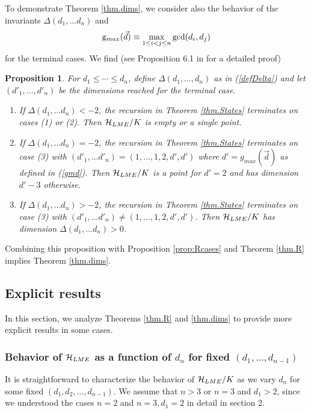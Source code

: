 \documentclass[12pt]{article}
\newtheorem{proposition}[theorem]{Proposition}
\theoremstyle{definition}
\newcommand{\be}{\begin{equation}}
\newcommand{\ee}{\end{equation}}
\begin{document}
To demonstrate Theorem \ref{thm.dims}, we consider also the behavior of the invariants $\Delta(d_1, \dots d_n)$ and
\be
\label{gmd2}
{\rm g}_{max}(\vec{d}) \equiv \max_{1 \le i < j \le n} \gcd(d_i,d_j)
\ee
for the terminal cases. We find (see Proposition 6.1 in \cite{mathpaper} for a detailed proof)
\begin{proposition} \label{prop.terminal}
For $d_1 \le \cdots \le d_n$, define $\Delta(d_1, \dots, d_n)$ as in (\ref{defDelta}) and let $(d'_1, \dots, d'_n)$ be the dimensions reached for the terminal case.
\begin{enumerate}
\item
If $\Delta(d_1, \dots d_n) < -2$, the recursion in Theorem \ref{thm.States} terminates on cases (1) or (2). Then ${\cal H}_{LME}/K$ is empty or a single point.
\item
If $\Delta(d_1, \dots d_n) = -2$, the recursion in Theorem \ref{thm.States} terminates on case (3) with $(d'_1, \dots d'_n) = (1,\dots,1,2,d',d')$ where $d' = g_{max}(\vec{d})$ as defined in (\ref{gmd}). Then ${\cal H}_{LME}/K$ is a point for $d'=2$ and has dimension $d'-3$ otherwise.
\item
If $\Delta(d_1, \dots d_n) > -2$, the recursion in Theorem \ref{thm.States} terminates on case (3) with $(d'_1, \dots d'_n) \ne (1,\dots,1,2,d',d')$. Then ${\cal H}_{LME}/K$ has dimension $\Delta(d_1, \dots d_n) > 0$.
\end{enumerate}
\end{proposition}
Combining this proposition with Proposition \ref{prop:Rcases} and Theorem \ref{thm.R} implies Theorem \ref{thm.dims}.

\subsection{Explicit results}

In this section, we analyze Theorems \ref{thm.R} and \ref{thm.dims} to provide more explicit results in some cases.

\subsubsection*{Behavior of ${\cal H}_{LME}$ as a function of $d_n$ for fixed $(d_1, \dots, d_{n-1})$}

It is straightforward to characterize the behavior of ${\cal H}_{LME}/K$ as we vary $d_n$ for some fixed $(d_1,d_2,\dots,d_{n-1})$. We assume that $n > 3$ or $n=3$ and $d_1 > 2$, since we understood the cases $n=2$ and $n=3, d_1=2$ in detail in section 2.
\end{document}
